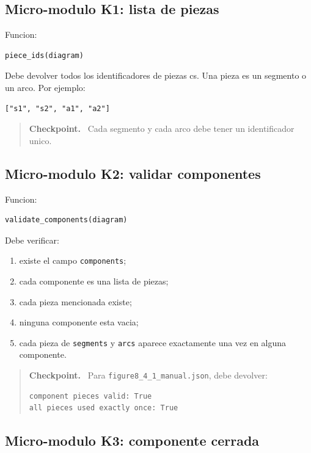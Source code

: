 \documentclass[11pt,letterpaper]{amsart}
\newenvironment{checkpoint}
{\par\medskip\noindent\begin{quote}\textbf{Checkpoint.}\ }
{\end{quote}\par\medskip}
\begin{document}
\subsection{Micro-modulo K1: lista de piezas}

Funcion:
\begin{verbatim}
piece_ids(diagram)
\end{verbatim}

Debe devolver todos los identificadores de piezas cs. Una pieza es un segmento o
un arco. Por ejemplo:

\begin{verbatim}
["s1", "s2", "a1", "a2"]
\end{verbatim}

\begin{checkpoint}
Cada segmento y cada arco debe tener un identificador unico.
\end{checkpoint}

\subsection{Micro-modulo K2: validar componentes}

Funcion:
\begin{verbatim}
validate_components(diagram)
\end{verbatim}

Debe verificar:

\begin{enumerate}[label=\textbf{\arabic*.}]
\item existe el campo \texttt{components};
\item cada componente es una lista de piezas;
\item cada pieza mencionada existe;
\item ninguna componente esta vacia;
\item cada pieza de \texttt{segments} y \texttt{arcs} aparece exactamente una vez
en alguna componente.
\end{enumerate}

\begin{checkpoint}
Para \texttt{figure8\_4\_1\_manual.json}, debe devolver:
\begin{verbatim}
component pieces valid: True
all pieces used exactly once: True
\end{verbatim}
\end{checkpoint}

\subsection{Micro-modulo K3: componente cerrada}
\end{document}
